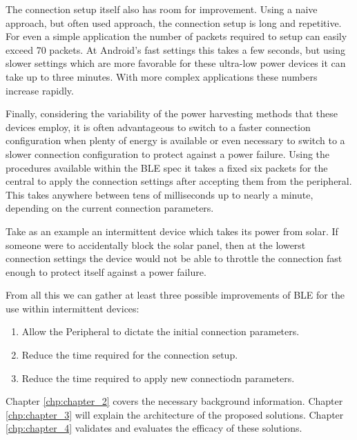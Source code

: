 The connection setup itself also has room for improvement. Using a naive approach, but often used approach, the connection setup is long and repetitive. For even a simple application the number of packets required to setup can easily exceed 70 packets. At Android's fast settings this takes a few seconds, but using slower settings which are more favorable for these ultra-low power devices it can take up to three minutes. With more complex applications these numbers increase rapidly.

Finally, considering the variability of the power harvesting methods that these devices employ, it is often advantageous to switch to a faster connection configuration when plenty of energy is available or even necessary to switch to a slower connection configuration to protect against a power failure. Using the procedures available within the BLE spec it takes a fixed six packets for the central to apply the connection settings after accepting them from the peripheral. This takes anywhere between tens of milliseconds up to nearly a minute, depending on the current connection parameters. 

Take as an example an intermittent device which takes its power from solar. If someone were to accidentally block the solar panel, then at the lowerst connection settings the device would not be able to throttle the connection fast enough to protect itself against a power failure.

From all this we can gather at least three possible improvements of BLE for the use within intermittent devices:
\begin{enumerate}
    \item Allow the Peripheral to dictate the initial connection parameters.
    \item Reduce the time required for the connection setup.
    \item Reduce the time required to apply new connectiodn parameters.
\end{enumerate}
Chapter \ref*{chp:chapter_2} covers the necessary background information. Chapter \ref*{chp:chapter_3} will explain the architecture of the proposed solutions. Chapter \ref*{chp:chapter_4} validates and evaluates the efficacy of these solutions.